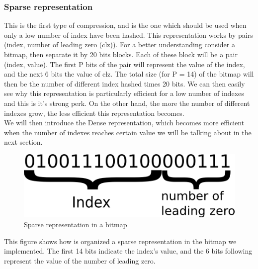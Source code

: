 \documentclass{article}
\begin{document}
\subsubsection{Sparse representation}
This is the first type of compression, and is the one which should be
used when only a low number of index have been hashed. This
representation works by pairs (index, number of leading zero (clz)).
For a better understanding consider a bitmap, then separate it by 20
bits blocks. Each of these block will be a pair (index, value). The
first P bits of the pair will represent the value of the index, and
the next 6 bits the value of clz. The total size (for P = 14) of the
bitmap will then be the number of different index hashed times 20
bits. We can then easily see why this representation is particularly
efficient for a low number of indexes and this is it's strong perk. On
the other hand, the more the number of different indexes grow, the
less efficient this representation becomes. \\ We will then introduce
the Dense representation, which becomes more efficient when the number
of indexes reaches certain value we will be talking about in the next
section. \\

\begin{center}
\begin{figure}[h]
\includegraphics[scale=0.5]{sparse.png}
\caption{Sparse representation in a bitmap}
\end{figure}
\end{center}

This figure shows how is organized a sparse representation in the
bitmap we implemented.  The first 14 bits indicate the index's value,
and the 6 bits following represent the value of the number of leading
zero.
\end{document}

